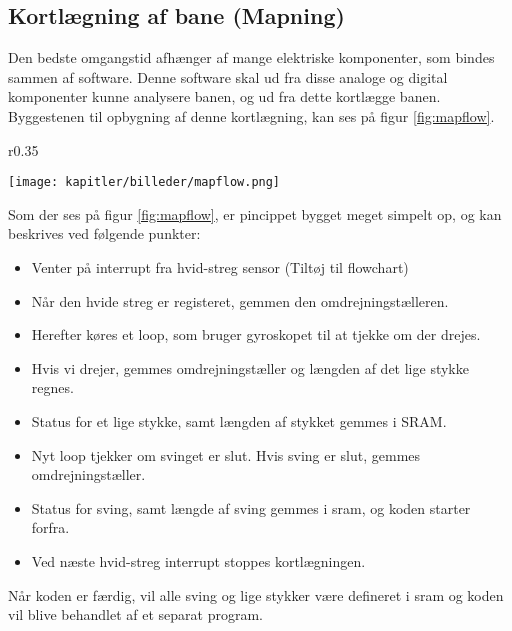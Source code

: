 \newpage
\subsection{Kortlægning af bane (Mapning)}
Den bedste omgangstid afhænger af mange elektriske komponenter, som bindes sammen af software.
Denne software skal ud fra disse analoge og digital komponenter kunne analysere banen, og ud fra dette
kortlægge banen. Byggestenen til opbygning af denne kortlægning, kan ses på figur \ref{fig:mapflow}.

\begin{wrapfigure}{r}{0.35\textwidth}
  \vspace{-10pt}
  \begin{center}
      \texttt{[image: kapitler/billeder/mapflow.png]}
    \end{center}
    \vspace{-10pt}
    \caption{Viser grundstenene af koden til kortlægning af banen.}
    \label{fig:mapflow}
\end{wrapfigure}

Som der ses på figur \ref{fig:mapflow}, er pincippet bygget meget simpelt op, og kan beskrives ved følgende punkter:

\begin{itemize}
\item Venter på interrupt fra hvid-streg sensor (Tiltøj til flowchart)
\item Når den hvide streg er registeret, gemmen den omdrejningstælleren.
\item Herefter køres et loop, som bruger gyroskopet til at tjekke om der drejes.
\item Hvis vi drejer, gemmes omdrejningstæller og længden af det lige stykke regnes.
\item Status for et lige stykke, samt længden af stykket gemmes i SRAM.
\item Nyt loop tjekker om svinget er slut. Hvis sving er slut, gemmes omdrejningstæller.
\item Status for sving, samt længde af sving gemmes i sram, og koden starter forfra.
\item Ved næste hvid-streg interrupt stoppes kortlægningen.
\end{itemize}

Når koden er færdig, vil alle sving og lige stykker være defineret i sram og koden vil blive behandlet
af et separat program.
